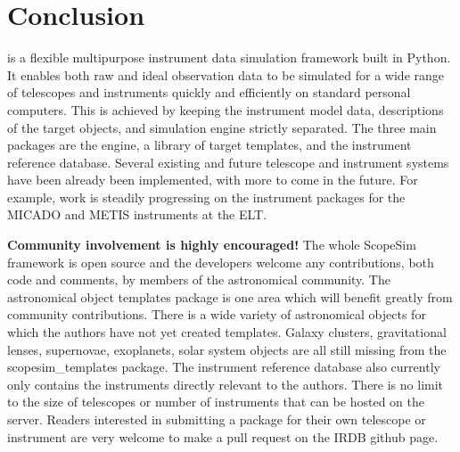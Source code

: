 \section{Conclusion}
\label{conclusion}

\ScopeSim{} is a flexible multipurpose instrument data simulation framework built in Python.
It enables both raw and ideal observation data to be simulated for a wide range of telescopes and instruments quickly and efficiently on standard personal computers.
This is achieved by keeping the instrument model data, descriptions of the target objects, and simulation engine strictly separated.
The three main packages are the \ScopeSim{} engine, a library of target templates, and the instrument reference database.
Several existing and future telescope and instrument systems have been already been implemented, with more to come in the future.
For example, work is steadily progressing on the instrument packages for the MICADO and METIS\cite{metis2018} instruments at the ELT.

\textbf{Community involvement is highly encouraged!}
The whole ScopeSim framework is open source and the developers welcome any contributions, both code and comments, by members of the astronomical community.
The astronomical object templates package is one area which will benefit greatly from community contributions.
There is a wide variety of astronomical objects for which the authors have not yet created templates.
Galaxy clusters, gravitational lenses, supernovae, exoplanets, solar system objects are all still missing from the scopesim\_templates package.
The instrument reference database also currently only contains the instruments directly relevant to the authors.
There is no limit to the size of telescopes or number of instruments that can be hosted on the server.
Readers interested in submitting a package for their own telescope or instrument are very welcome to make a pull request on the IRDB github page.
